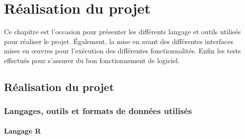\chapter{Réalisation du projet}
Ce chapitre est l’occasion pour présenter les différents langage et outils utilisés pour réaliser le projet. Également, la mise en avant des différentes interfaces mises en œuvres pour l’exécution des différentes fonctionnalités. Enfin les tests effectués pour s’assurer du bon fonctionnement de logiciel.

\newpage
\section {Réalisation du projet }
\subsection {Langages, outils et formats de données utilisés}
\subsubsection {Langage R}

